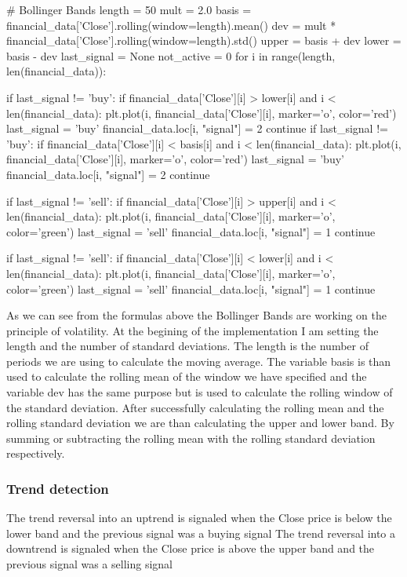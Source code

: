 \documentclass{imc-inf}
\begin{document}
	\begin{code}[language=Python, caption={Bollinger Bands Implementation}]
		# Bollinger Bands
		length = 50  
		mult = 2.0
		basis = financial_data['Close'].rolling(window=length).mean()
		dev = mult * financial_data['Close'].rolling(window=length).std()
		upper = basis + dev
		lower = basis - dev
		last_signal = None
		not_active = 0
		for i in range(length, len(financial_data)):
			
			
			if last_signal != 'buy':
				if financial_data['Close'][i] > lower[i] and i < len(financial_data):
					plt.plot(i, financial_data['Close'][i], marker='o', color='red')
					last_signal = 'buy'
					financial_data.loc[i, "signal"] = 2 
					continue
			if last_signal != 'buy':
				if financial_data['Close'][i] < basis[i] and i < len(financial_data):
					plt.plot(i, financial_data['Close'][i], marker='o', color='red')
					last_signal = 'buy'
					financial_data.loc[i, "signal"] = 2
					continue
			
			if last_signal != 'sell':
				if financial_data['Close'][i] > upper[i] and i < len(financial_data):
					plt.plot(i, financial_data['Close'][i], marker='o', color='green')
					last_signal = 'sell'
					financial_data.loc[i, "signal"] = 1
					continue
			
			
			if last_signal != 'sell':
				if financial_data['Close'][i] < lower[i] and i < len(financial_data):
					plt.plot(i, financial_data['Close'][i], marker='o', color='green')
					last_signal = 'sell'
					financial_data.loc[i, "signal"] = 1
					continue 
	\end{code}
	As we can see from the formulas above the Bollinger Bands are working on the principle of volatility.
	At the begining of the implementation I am setting the length and the number of standard deviations. The length is the number of periods we are using to calculate
	the moving average. The variable basis is than used to calculate the rolling mean of the window we have specified and the variable dev 
	has the same purpose but is used to calculate the rolling window of the standard deviation.
	After successfully calculating the rolling mean and the rolling standard deviation we are than calculating the upper and lower band. By
	summing or subtracting the rolling mean with the rolling standard deviation respectively.
	
	\subsubsection{Trend detection}
	The trend reversal into an uptrend is signaled when the Close price is below the lower band and the previous signal was a buying signal
	The trend reversal into a downtrend is signaled when the Close price is above the upper band and the previous signal was a selling signal
	
\end{document}
